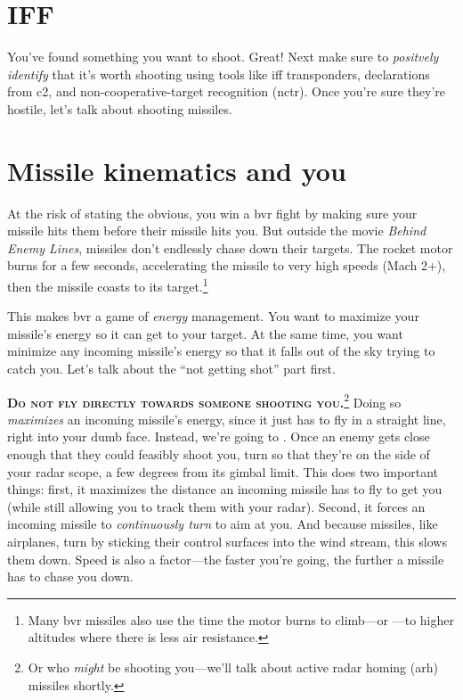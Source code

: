 \section{IFF}

You've found something you want to shoot. Great!
Next make sure to \emph{positvely identify}
that it's worth shooting using tools like
\ac{iff} transponders,
declarations from \ac{c2},
and non-cooperative-target recognition \ac{(nctr)}.
Once you're sure they're hostile, let's talk about shooting missiles.

\section{Missile kinematics and you}

At the risk of stating the obvious, you win a \ac{bvr} fight by making sure your
missile hits them before their missile hits you.
But outside the movie \emph{Behind Enemy Lines},
missiles don't endlessly chase down their targets.
The rocket motor burns for a few seconds,
accelerating the missile to very high speeds (Mach 2+),
then the missile coasts to its target.\punckern\footnote{Many
\ac{bvr} missiles also use the time the motor burns to climb---or
---to higher altitudes where there is less air resistance.}

This makes \ac{bvr} a game of \emph{energy} management.
You want to maximize your missile's energy so it can get to your target.
At the same time, you want minimize any incoming missile's energy
so that it falls out of the sky trying to catch you.
Let's talk about the ``not getting shot'' part first.

\textbf{\textsc{Do not fly directly towards someone shooting
you.}}\punckern\footnote{Or who \emph{might} be shooting you---we'll talk about
active radar homing \ac{(arh)} missiles shortly.}
Doing so \emph{maximizes} an incoming missile's energy,
since it just has to fly in a straight line, right into your dumb face.
Instead, we're going to .
Once an enemy gets close enough that they could feasibly shoot you,
turn so that they're on the side of your radar scope,
a few degrees from its gimbal limit.
This does two important things:
first, it maximizes the distance an incoming missile has to fly to get you
(while still allowing you to track them with your radar).
Second, it forces an incoming missile to \emph{continuously turn} to
aim at you.
And because missiles, like airplanes, turn by sticking their control surfaces
into the wind stream, this slows them down.
Speed is also a factor---the faster you're going,
the further a missile has to chase you down.


